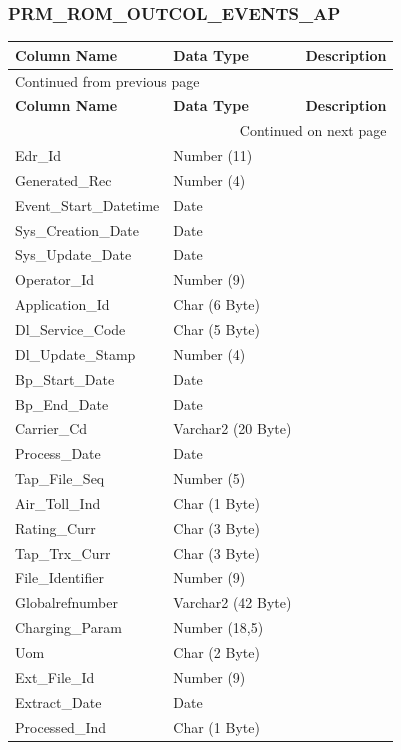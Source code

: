 \documentclass[12pt,twoside]{article}
\begin{document}
\subsubsection{PRM\_ROM\_OUTCOL\_EVENTS\_AP}
\label{sec:orgheadline84}
\footnotesize
\begin{longtable}{l|l|l}
\hline
\textbf{Column Name} & \textbf{Data Type} & \textbf{Description}\\
\hline
\endfirsthead
\multicolumn{3}{l}{Continued from previous page} \\
\hline

\textbf{Column Name} & \textbf{Data Type} & \textbf{Description} \\

\hline
\endhead
\hline\multicolumn{3}{r}{Continued on next page} \\
\endfoot
\endlastfoot
\hline
Edr\_Id & Number (11) & \\
Generated\_Rec & Number (4) & \\
Event\_Start\_Datetime & Date & \\
Sys\_Creation\_Date & Date & \\
Sys\_Update\_Date & Date & \\
Operator\_Id & Number (9) & \\
Application\_Id & Char (6 Byte) & \\
Dl\_Service\_Code & Char (5 Byte) & \\
Dl\_Update\_Stamp & Number (4) & \\
Bp\_Start\_Date & Date & \\
Bp\_End\_Date & Date & \\
Carrier\_Cd & Varchar2 (20 Byte) & \\
Process\_Date & Date & \\
Tap\_File\_Seq & Number (5) & \\
Air\_Toll\_Ind & Char (1 Byte) & \\
Rating\_Curr & Char (3 Byte) & \\
Tap\_Trx\_Curr & Char (3 Byte) & \\
File\_Identifier & Number (9) & \\
Globalrefnumber & Varchar2 (42 Byte) & \\
Charging\_Param & Number (18,5) & \\
Uom & Char (2 Byte) & \\
Ext\_File\_Id & Number (9) & \\
Extract\_Date & Date & \\
Processed\_Ind & Char (1 Byte) & \\

\end{longtable}
\end{document}
